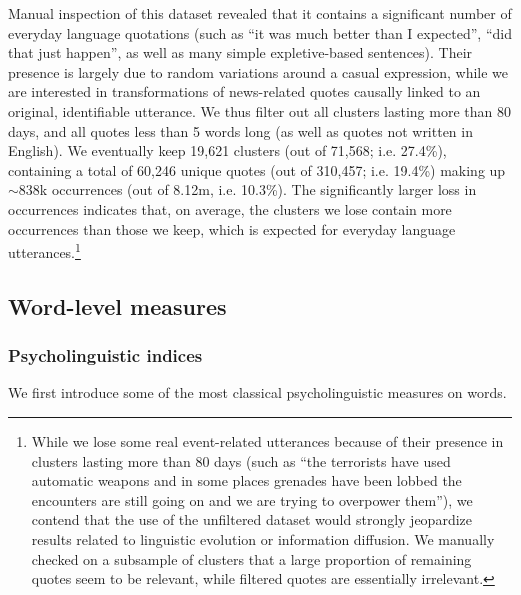 Manual inspection of this dataset revealed that it contains a significant number of everyday language quotations (such as ``it was much better than I expected'', ``did that just happen'', as well as many simple expletive-based sentences).
Their presence is largely due to random variations around a casual expression, while we are interested in transformations of news-related quotes causally linked to an original, identifiable utterance.
We thus filter out all clusters lasting more than 80 days, and all quotes less than 5 words long %
 (as well as quotes not written in English).
We eventually keep 19,621 clusters (out of 71,568; i.e. 27.4\%), containing a total of 60,246 unique quotes (out of 310,457; i.e. 19.4\%) making up $\sim$838k occurrences (out of 8.12m, i.e. 10.3\%).
The significantly larger loss in occurrences indicates that, on average, the clusters we lose contain more occurrences than those we keep, which is expected for everyday language utterances.\footnote{While we lose some real event-related utterances because of their presence in clusters lasting more than 80 days (such as ``the terrorists have used automatic weapons and in some places grenades have been lobbed the encounters are still going on and we are trying to overpower them''), we contend that the use of the unfiltered dataset would strongly jeopardize results related to linguistic evolution or information diffusion. We manually checked on a subsample of clusters that a large proportion of remaining quotes seem to be relevant, while filtered quotes are essentially irrelevant.}

\subsection{Word-level measures}


\subsubsection{Psycholinguistic indices}

We first introduce some of the most classical psycholinguistic measures on words.

